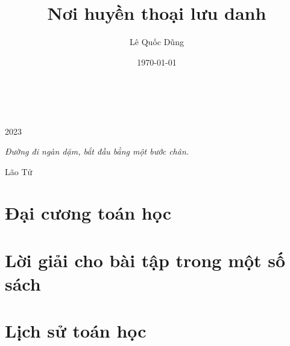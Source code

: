 \documentclass[oneside]{book}
\title{Nơi huyền thoại lưu danh}
\author{Lê Quốc Dũng}
\date{\today}
\begin{document}
\begin{titlepage}
		\\
			
		\vspace{10mm}
		\\
		\vspace{\fill}
		\centering \large{2023}
\end{titlepage}

\newpage

\vspace*{2cm}

\begin{center}
	\Large{\parbox{10cm}{
		\begin{raggedright}
		{\Large 
			\textit{Đường đi ngàn dặm, bắt đầu bằng một bước chân.}
		}
	
		\vspace{.5cm}\hfill{Lão Tử}
		\end{raggedright}
	}
}
\end{center}

\newpage

\tableofcontents

\newpage



\part{Đại cương toán học}








\part{Lời giải cho bài tập trong một số sách}


\part{Lịch sử toán học}

\end{document}
